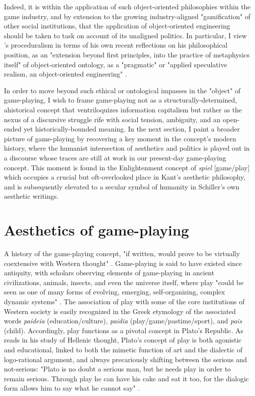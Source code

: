Indeed, it is within the application of such object-oriented philosophies within the game industry, and by extension to the growing industry-aligned "gamification" of other social institutions, that the application of object-oriented engineering should be taken to task on account of its unaligned politics. In particular, I view \citeauthor{Bogost2006-ec}'s proceduralism in terms of his own recent reflections on his philosophical position, as an "extension beyond first principles, into the practice of metaphysics itself" of object-oriented ontology, as a "pragmatic" or "applied speculative realism, an object-oriented engineering" \autocite*[674--7]{Bogost2012-wr}.

In order to move beyond such ethical or ontological impasses in the "object" of game-playing, I wish to frame game-playing not as a structurally-determined, ahistorical concept that ventriloquizes information capitalism but rather as the nexus of a discursive struggle rife with social tension, ambiguity, and an open-ended yet historically-bounded meaning. In the next section, I paint a broader picture of game-playing by recovering a key moment in the concept's modern history, where the humanist intersection of aesthetics and politics is played out in a discourse whose traces are still at work in our present-day game-playing concept. This moment is found in the Enlightenment concept of \emph{spiel }[game/play] which occupies a crucial but oft-overlooked place in Kant's aesthetic philosophy, and is subsequently elevated to a secular symbol of humanity in Schiller's own aesthetic writings.

\section{Aesthetics of game-playing}
A history of the game-playing concept, "if written, would prove to be virtually coextensive with Western thought" \autocite[8]{Wilson1990-eu}. Game-playing is said to have existed since antiquity, with scholars observing elements of game-playing in ancient civilizations, animals, insects, and even the universe itself, where play "could be seen as one of many forms of evolving, emerging, self-organizing, complex dynamic systems" \autocite[251]{Brown1998}. The association of play with some of the core institutions of Western society is easily recognized in the Greek etymology of the associated words \emph{paideia} (education/culture), \emph{paidia} (play/game/pastime/sport), and \emph{pais} (child). Accordingly, play functions as a pivotal concept in Plato's Republic. As \citeauthor{Spariosu1991} reads in his study of Hellenic thought, Plato's concept of play is both agonistic and educational, linked to both the mimetic function of art and the dialectic of logo-rational argument, and always precariously shifting between the serious and not-serious: "Plato is no doubt a serious man, but he needs play in order to remain serious. Through play he can have his cake and eat it too, for the dialogic form allows him to say what he cannot say" \autocite[192]{Spariosu1991}.

